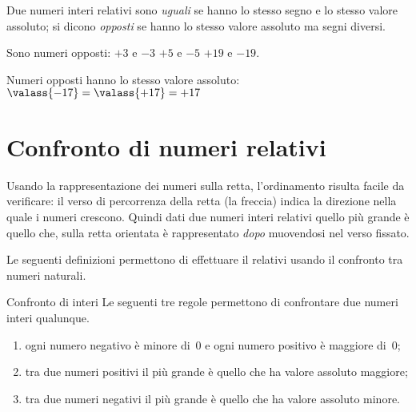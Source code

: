\begin{definizione}{}{}
Due numeri interi relativi sono \emph{uguali} se hanno lo stesso segno e 
lo stesso valore assoluto;
si dicono \emph{opposti}
se hanno lo stesso valore assoluto ma segni diversi.
\end{definizione}

\begin{esempio}{}{}
Sono numeri opposti: \qquad \(+3\) e \(-3\) \quad \(+5\) e \(-5\) 
\quad \(+19\) e \(-19\).
\end{esempio}

Numeri opposti hanno lo stesso valore assoluto: \qquad 
\(\valass{-17} = \valass{+17} = +17\)

\section{Confronto di numeri relativi}
\label{sec:int_confronto}

Usando la rappresentazione dei numeri sulla retta, 
l'ordinamento risulta 
facile da verificare:
il verso di percorrenza della retta (la freccia) indica la direzione nella 
quale i numeri crescono.
Quindi dati due numeri interi relativi quello più grande è quello che, sulla 
retta orientata è rappresentato \emph{dopo} muovendosi nel verso fissato.

Le seguenti definizioni permettono di effettuare il  relativi usando il confronto tra numeri 
naturali.

\begin{definizione}{Confronto di interi}{}
Le seguenti tre regole permettono di confrontare due numeri interi qualunque.
\begin{enumerate} [noitemsep] %
\item ogni numero negativo è minore di~0 e ogni numero 
positivo è maggiore di~0;
\item tra due numeri positivi il più grande è quello che ha valore 
assoluto maggiore;
\item tra due numeri negativi il più grande è quello che ha valore 
assoluto minore.
\end{enumerate}

\end{definizione}

